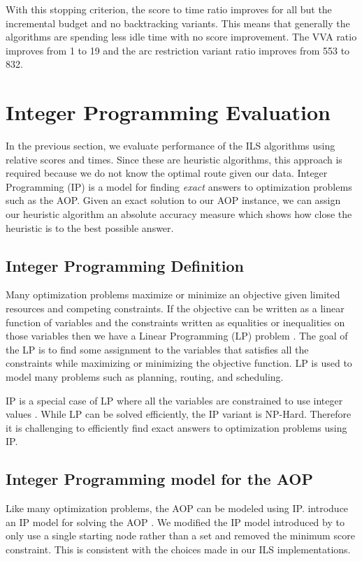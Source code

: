 \documentclass[honors]{union-cs-thesis}
\begin{document}
With this stopping criterion, the score to time ratio improves for all but the incremental budget and no backtracking variants. This means that generally the algorithms are spending less idle time with no score improvement.  The VVA ratio improves from 1 to 19 and the arc restriction variant ratio improves from 553 to 832.


\section{Integer Programming Evaluation}
\label{sec:int-programming}
In the previous section, we evaluate performance of the ILS algorithms using relative scores and times. Since these are heuristic algorithms, this approach is required because we do not know the optimal route given our data. Integer Programming (IP) is a model for finding \emph{exact} answers to optimization problems such as the AOP. Given an exact solution to our AOP instance, we can assign our heuristic algorithm an absolute accuracy measure which shows how close the heuristic is to the best possible answer.

\subsection{Integer Programming Definition}
Many optimization problems maximize or minimize an objective given limited resources and competing constraints. If the objective can be written as a linear function of variables and the constraints written as equalities or inequalities on those variables then we have a Linear Programming (LP) problem \cite{clrs}. The goal of the LP is to find some assignment to the variables that satisfies all the constraints while maximizing or minimizing the objective function. LP is used to model many problems such as planning, routing, and scheduling.

IP is a special case of LP where all the variables are constrained to use integer values \cite{ibm-int-programming}. While LP can be solved efficiently, the IP variant is NP-Hard. Therefore it is challenging to efficiently find exact answers to optimization problems using IP.

\subsection{Integer Programming model for the AOP}
Like many optimization problems, the AOP can be modeled using IP. \citeauthor{verbeeck2014extension} introduce an IP model for solving the AOP \cite{verbeeck2014extension}. We modified the IP model introduced by \citeauthor{verbeeck2014extension} to only use a single starting node rather than a set and removed the minimum score constraint. This is consistent with the choices made in our ILS implementations.
\end{document}

